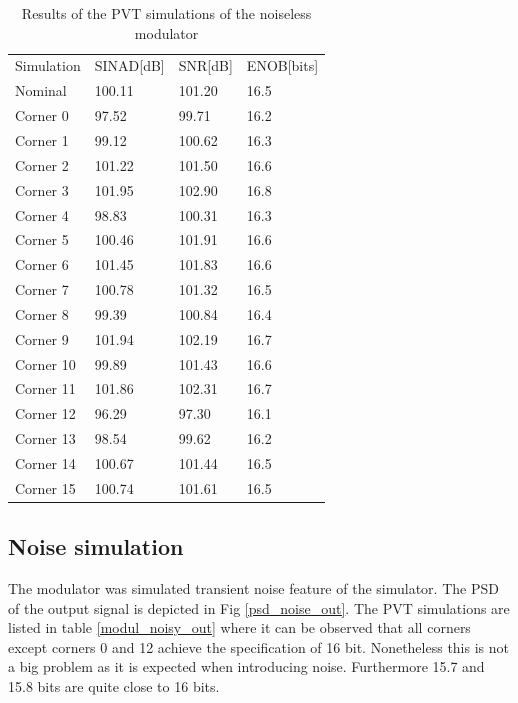 \begin{table}[H]
\centering

\caption{Results of the PVT simulations of the noiseless modulator}
\label{modul_noiseless_out}
\begin{tabular}{l|l|l|l}
\hline
\multirow{1}{*}{Simulation} & \multicolumn{1}{c|}{SINAD[dB]} & \multicolumn{1}{c|}{SNR[dB]} & \multicolumn{1}{c}{ENOB[bits]} \\\cline{1-4}
                       
            Nominal       &100.11 & 101.20 & 16.5\\
            Corner 0      &97.52 & 99.71 & 16.2\\
            Corner 1      &99.12 & 100.62 & 16.3\\
            Corner 2      &101.22 & 101.50 & 16.6\\
            Corner 3     &101.95 & 102.90 & 16.8\\
            Corner 4     &98.83 & 100.31 & 16.3\\
            Corner 5      &100.46 & 101.91 & 16.6\\
            Corner 6      &101.45& 101.83 & 16.6\\
            Corner 7      &100.78& 101.32 & 16.5\\
            Corner 8      &99.39& 100.84 & 16.4\\
            Corner 9      &101.94& 102.19 & 16.7\\
            Corner 10      &99.89& 101.43 & 16.6\\
            Corner 11      &101.86& 102.31 & 16.7\\
            Corner 12      &96.29& 97.30 & 16.1\\
            Corner 13      &98.54& 99.62 & 16.2\\
            Corner 14      &100.67& 101.44 & 16.5\\
            Corner 15      &100.74& 101.61 & 16.5\\
            
\hline            
\end{tabular}
\end{table}

\subsection{Noise simulation}
The modulator was simulated transient noise feature of the simulator. The PSD of the output signal is depicted in Fig \ref{psd_noise_out}. The PVT simulations are listed in table \ref{modul_noisy_out} where it can be observed that all corners except corners 0 and 12 achieve the specification of 16 bit. Nonetheless this is not a big problem as it is expected when introducing noise. Furthermore 15.7 and 15.8 bits are quite close to 16 bits. 

